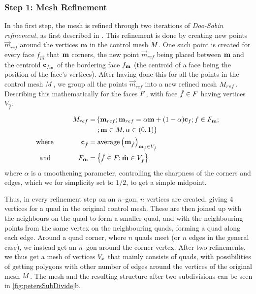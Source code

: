 \subsubsection{Step 1: Mesh Refinement}
In the first step, the mesh is refined through two iterations of \emph{Doo-Sabin refinement}, as first described in \cite{DooSabin1978subdiv}. This refinement is done by creating new points $\vec{m}_{ref}$ around the vertices $\petersControlMeshVec$ in the control mesh $\petersControlMesh$. One such point is created for every face $f_{\vec{m}}$ that $\petersControlMeshVec$ corners, the new point $\vec{m}_{ref}$ being placed between $\petersControlMeshVec$ and the centroid $\centroidof{f_{\petersControlMeshVec}}$ of the bordering face $f_{\petersControlMeshVec}$ (the centroid of a face being the position of the face's vertices). After having done this for all the points in the control mesh $\petersControlMesh$, we group all the points $\vec{m}_{ref}$ into a new refined mesh $\petersControlMeshRef$. Describing this mathematically for the faces $\petersFaces$, with face ${\hat{f}}\in \petersFaces$ having vertices $V_{\hat{f}}$:

\begin{align}
\petersControlMeshRef =& \left\lbrace \petersControlMeshVec_{ref} \suchthat\petersControlMeshVec_{ref} = \alpha\petersControlMeshVec + (1-\alpha)\centroidof{f} \suchthat f \in \facesof{\petersControlMeshVec} \suchthat \right.
\\ \notag &
 \left. \suchthat \petersControlMeshVec \in \petersControlMesh, \alpha \in (0,1) \right\rbrace
\\
\where \qquad\qquad \centroidof{\hat{f}} =& \; \text{average}\left(\petersControlMeshVec_{\hat{f}}\right)_{\petersControlMeshVec_{\hat{f}} \in \verticesof{\hat{f}}}
\\
\text{and} \qquad\qquad F_{\vec{\hat{m}}} =& \left\lbrace \hat{f} \in \petersFaces \suchthat \vec{\hat{m}} \in \verticesof{\hat{f}}	\right\rbrace
\end{align}
where $\alpha$ is a smoothening parameter, controlling the sharpness of the corners and edges, which we for simplicity set to $1/2$, to get a simple midpoint.

Thus, in every refinement step on an $n$--gon, $n$ vertices are created, giving 4 vertices for a quad in the original control mesh. These are then joined up with the neighbours on the quad to form a smaller quad, and with the neighbouring points from the same vertex on the neighbouring quads, forming a quad along each edge. Around a quad corner, where $n$ quads meet (or $n$ edges in the general case), we instead get an $n$--gon around the corner vertex. After two refinements, we thus get a mesh of vertices $\petersPatchPoints$ that mainly consists of quads, with possibilities of getting polygons with other number of edges around the vertices of the original mesh $\petersControlMesh$. The mesh and the resulting structure after two subdivisions can be seen in \autoref{fig:petersSubDivide}b.

